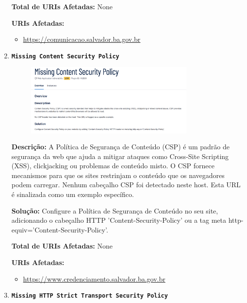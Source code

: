 \documentclass[a4paper,12pt]{article}
\begin{document}
\begin{enumerate}
\textbf{Total de URIs Afetadas:} None

\textbf{URIs Afetadas:}
\begin{itemize}
    \item \url{https://comunicacao.salvador.ba.gov.br}
\end{itemize}

\item \textbf{\texttt{Missing Content Security Policy}}

                        \begin{figure}[h!]
                        \centering
                        \includegraphics[width=0.8\textwidth]{assets/images-was/Vulnerabilidades Relacionadas a Configurações de Segurança HTTP E TLS/Missing Content Security Policy.png}
                        \end{figure}
                        \FloatBarrier
                        \textbf{Descrição:} A Política de Segurança de Conteúdo (CSP) é um padrão de segurança da web que ajuda a mitigar ataques como Cross-Site Scripting (XSS), clickjacking ou problemas de conteúdo misto. O CSP fornece mecanismos para que os sites restrinjam o conteúdo que os navegadores podem carregar.
 Nenhum cabeçalho CSP foi detectado neste host. Esta URL é sinalizada como um exemplo específico.

\textbf{Solução:} Configure a Política de Segurança de Conteúdo no seu site, adicionando o cabeçalho HTTP 'Content-Security-Policy' ou a tag meta http-equiv='Content-Security-Policy'.

\textbf{Total de URIs Afetadas:} None

\textbf{URIs Afetadas:}
\begin{itemize}
    \item \url{https://www.credenciamento.salvador.ba.gov.br}
\end{itemize}

\item \textbf{\texttt{Missing HTTP Strict Transport Security Policy}}


\end{enumerate}
\end{document}
